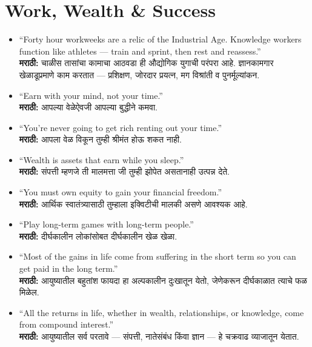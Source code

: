 \section*{Work, Wealth \& Success}
\begin{itemize}
    \item ``Forty hour workweeks are a relic of the Industrial Age. Knowledge workers function like athletes — train and sprint, then rest and reassess.'' \\
    \textbf{मराठी:} चाळीस तासांचा कामाचा आठवडा ही औद्योगिक युगाची परंपरा आहे. ज्ञानकामगार खेळाडूप्रमाणे काम करतात — प्रशिक्षण, जोरदार प्रयत्न, मग विश्रांती व पुनर्मूल्यांकन.

    \item ``Earn with your mind, not your time.'' \\
    \textbf{मराठी:} आपल्या वेळेऐवजी आपल्या बुद्धीने कमवा.

    \item ``You’re never going to get rich renting out your time.'' \\
    \textbf{मराठी:} आपला वेळ विकून तुम्ही श्रीमंत होऊ शकत नाही.

    \item ``Wealth is assets that earn while you sleep.'' \\
    \textbf{मराठी:} संपत्ती म्हणजे ती मालमत्ता जी तुम्ही झोपेत असतानाही उत्पन्न देते.

    \item ``You must own equity to gain your financial freedom.'' \\
    \textbf{मराठी:} आर्थिक स्वातंत्र्यासाठी तुम्हाला इक्विटीची मालकी असणे आवश्यक आहे.

    \item ``Play long-term games with long-term people.'' \\
    \textbf{मराठी:} दीर्घकालीन लोकांसोबत दीर्घकालीन खेळ खेळा.

    \item ``Most of the gains in life come from suffering in the short term so you can get paid in the long term.'' \\
    \textbf{मराठी:} आयुष्यातील बहुतांश फायदा हा अल्पकालीन दुःखातून येतो, जेणेकरून दीर्घकाळात त्याचे फळ मिळेल.

    \item ``All the returns in life, whether in wealth, relationships, or knowledge, come from compound interest.'' \\
    \textbf{मराठी:} आयुष्यातील सर्व परतावे — संपत्ती, नातेसंबंध किंवा ज्ञान — हे चक्रवाढ व्याजातून येतात.
\end{itemize}


